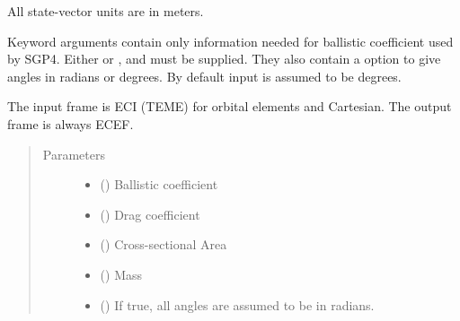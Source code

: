 \documentclass[letterpaper,10pt,english]{sphinxmanual}
\begin{document}
\begin{fulllineitems}
\begin{fulllineitems}
\label{\detokenize{modules/propagator_sgp4:propagator_sgp4.PropagatorSGP4.get_orbit_cart}}

All state-vector units are in meters.

Keyword arguments contain only information needed for ballistic coefficient  used by SGP4. Either  or ,  and  must be supplied.
They also contain a option to give angles in radians or degrees. By default input is assumed to be degrees.


The input frame is ECI (TEME) for orbital elements and Cartesian. The output frame is always ECEF.
\begin{quote}\begin{description}
\item[{Parameters}] \leavevmode\begin{itemize}
\item {} 
 () \textendash{} Ballistic coefficient

\item {} 
 () \textendash{} Drag coefficient

\item {} 
 () \textendash{} Cross-sectional Area

\item {} 
 () \textendash{} Mass

\item {} 
 () \textendash{} If true, all angles are assumed to be in radians.

\end{itemize}

\end{description}\end{quote}

\end{fulllineitems}


\end{fulllineitems}
\end{document}
